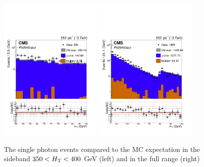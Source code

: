 \begin{figure}[!h]
  \centering
  \includegraphics[width=0.45\textwidth]{figures/sidebandCorr/htSideband_NMinusOne_HT_GJets}
  \includegraphics[width=0.45\textwidth]{figures/sidebandCorr/ht_NMinusOne_HT_GJets}
  \caption{The single photon events compared to the MC expectation in the sideband $350 < \scalht < 400$ GeV (left) and in the full \scalht range (right)}
  \label{fig:gjets_HTsideband}
\end{figure}



